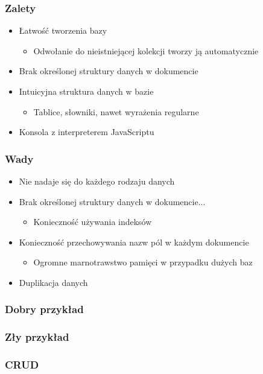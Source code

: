 \documentclass{beamer}
\begin{document}
  \begin{frame}
    \frametitle{Zalety}
    \begin{itemize}
      \item Łatwość tworzenia bazy
      \begin{itemize}
        \item Odwołanie do nieistniejącej kolekcji tworzy ją automatycznie
      \end{itemize}
      \item Brak określonej struktury danych w dokumencie
      \item Intuicyjna struktura danych w bazie
      \begin{itemize}
        \item Tablice, słowniki, nawet wyrażenia regularne
      \end{itemize}
      \item Konsola z interpreterem JavaScriptu
    \end{itemize}
  \end{frame}

  \begin{frame}
    \frametitle{Wady}
    \begin{itemize}
      \item Nie nadaje się do każdego rodzaju danych
      \item Brak określonej struktury danych w dokumencie...
      \begin{itemize}
        \item Konieczność używania indeksów
      \end{itemize}
      \item Konieczność przechowywania nazw pól w każdym dokumencie
      \begin{itemize}
        \item Ogromne marnotrawstwo pamięci w przypadku dużych baz
      \end{itemize}
      \item Duplikacja danych
    \end{itemize}
  \end{frame}

  \begin{frame}
    \frametitle{Dobry przykład}
  \end{frame}

  \begin{frame}
    \frametitle{Zły przykład}
  \end{frame}

  \begin{frame}
    \frametitle{CRUD}
  \end{frame}
\end{document}
